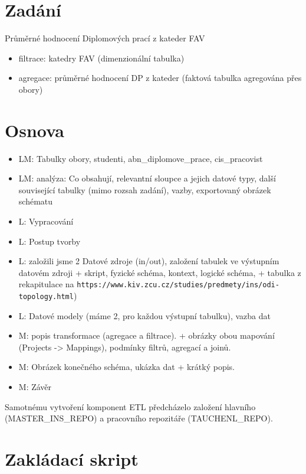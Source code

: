 \section{Zadání}

Průměrné hodnocení Diplomových prací z kateder FAV

\begin{itemize}
    \item filtrace: katedry FAV (dimenzionální tabulka)
    \item agregace: průměrné hodnocení DP z kateder (faktová tabulka agregována přes obory)
\end{itemize}

\section{Osnova}

\begin{itemize}
    \item LM: Tabulky obory, studenti, abn\_diplomove\_prace, cis\_pracovist
    \item LM: analýza: Co obsahují, relevantní sloupce a jejich datové typy, další související tabulky (mimo rozsah zadání), vazby, exportovaný obrázek schématu
    \item L: Vypracování
    \item L: Postup tvorby
    \item L: založili jsme 2 Datové zdroje (in/out), založení tabulek ve výstupním datovém zdroji + skript, fyzické schéma, kontext, logické schéma, + tabulka z rekapitulace na \nolinkurl{https://www.kiv.zcu.cz/studies/predmety/ins/odi-topology.html})
    \item L: Datové modely (máme 2, pro každou výstupní tabulku), vazba dat
    \item M: popis transformace (agregace a filtrace). + obrázky obou mapování (Projects -> Mappings), podmínky filtrů, agregací a joinů.
    \item M: Obrázek konečného schéma, ukázka dat + krátký popis.
    \item M: Závěr
\end{itemize}

Samotnému vytvoření komponent ETL předcházelo založení hlavního (MASTER\_INS\_REPO) a pracovního repozitáře (TAUCHENL\_REPO).

\section{Zakládací skript}

